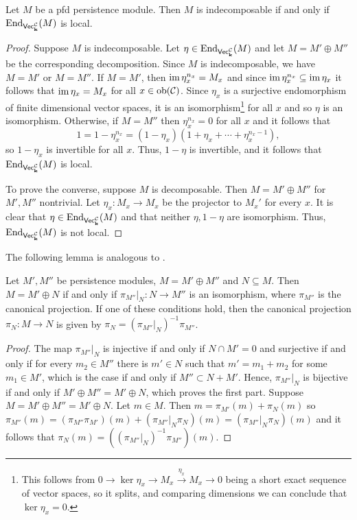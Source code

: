 \begin{lemma}\label{lemma:indecpomposableIffLocal}
    Let $M$ be a pfd persistence module. 
    Then $M$ is indecomposable if and only if $\operatorname{End}_{\normalfont\mathsf{Vec}_{\mathbf{k}}^{\mathcal{C}}}(M)$ is local.
\end{lemma}
\begin{proof}
    Suppose $M$ is indecomposable.
    Let $\eta\in\operatorname{End}_{\normalfont\mathsf{Vec}_{\mathbf{k}}^{\mathcal{C}}}(M)$ and let $M=M'\oplus M''$ be the corresponding decomposition.
    Since $M$ is indecomposable, we have $M=M'$ or $M=M''$.
    If $M=M'$, then $\operatorname{im}\eta_x^{n_x}=M_x$ and since $\operatorname{im}\eta_x^{n_x}\subseteq\operatorname{im}\eta_x$ it follows that $\operatorname{im}\eta_x=M_x$ for all $x\in\operatorname{ob}(\mathcal{C})$.
    Since $\eta_x$ is a surjective endomorphism of finite dimensional vector spaces, it is an isomorphism\footnote{
        This follows from $0\to\ker\eta_x\to M_x\xrightarrow{\eta_x} M_x\to 0$ being a short exact sequence of vector spaces, so it splits, and comparing dimensions we can conclude that $\ker\eta_x=0$.
    } for all $x$ and so $\eta$ is an isomorphism. 
    Otherwise, if $M=M''$ then $\eta_x^{n_x}=0$ for all $x$ and it follows that
    \[1=1-\eta_x^{n_x}=(1-\eta_x)\left(1+\eta_x+\cdots+\eta_x^{n_x-1}\right),\]
    so $1-\eta_x$ is invertible for all $x$.
    Thus, $1-\eta$ is invertible, and it follows that $\operatorname{End}_{\normalfont\mathsf{Vec}_{\mathbf{k}}^{\mathcal{C}}}(M)$ is local.
    
    To prove the converse, suppose $M$ is decomposable. Then $M=M'\oplus M''$ for $M',M''$ nontrivial.
    Let $\eta_x\colon M_x\to M_x$ be the projector to $M_x'$ for every $x$. It is clear that $\eta\in\operatorname{End}_{\normalfont\mathsf{Vec}_{\mathbf{k}}^{\mathcal{C}}}(M)$ and that neither $\eta, 1-\eta$ are isomorphism.
    Thus, $\operatorname{End}_{\normalfont\mathsf{Vec}_{\mathbf{k}}^{\mathcal{C}}}(M)$ is not local.
\end{proof}

The following lemma is analogous to \cite[Lemma 2.6]{facchini_1998}.
\begin{lemma}\label{lemma:projectionIsIso}
    Let $M',M''$ be persistence modules, $M=M'\oplus M''$ and $N\subseteq M$.
    Then $M=M'\oplus N$ if and only if $\pi_{M''}\vert_{N}\colon N\to M''$ is an isomorphism, where $\pi_{M''}$ is the canonical projection.
    If one of these conditions hold, then the canonical projection $\pi_{N}\colon M\to N$ is given by $\pi_{N}=(\pi_{M''}\vert_{N})^{-1}\pi_{M''}$.
\end{lemma}
\begin{proof}
    The map $\pi_{M''}\vert_{N}$ is injective if and only if $N\cap M'=0$ and surjective if and only if for every $m_2\in M''$ there is $m'\in N$ such that $m'=m_1+m_2$ for some $m_1\in M'$, which is the case if and only if $M''\subset N+M'$. 
    Hence, $\pi_{M''}\vert_{N}$ is bijective if and only if $M'\oplus M''=M'\oplus N$, which proves the first part.
    Suppose $M=M'\oplus M''=M'\oplus N$. 
    Let $m\in M$. 
    Then $m=\pi_{M'}(m)+\pi_{N}(m)$ so $\pi_{M''}(m)=(\pi_{M''}\pi_{M'})(m)+(\pi_{M''}\vert_{N}\pi_{N})(m)=(\pi_{M''}\vert_{N}\pi_{N})(m)$ and it follows that $\pi_{N}(m)=\left((\pi_{M''}\vert_{N})^{-1}\pi_{M''}\right)(m)$.
\end{proof}

